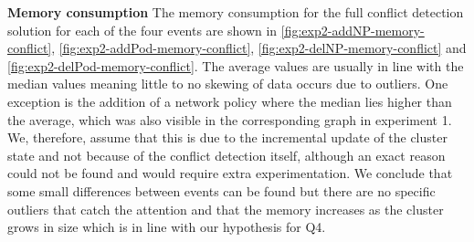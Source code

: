\textbf{Memory consumption}
\newline The memory consumption for the full conflict detection solution for each of the four events are shown in \autoref{fig:exp2-addNP-memory-conflict}, \autoref{fig:exp2-addPod-memory-conflict}, \autoref{fig:exp2-delNP-memory-conflict} and \autoref{fig:exp2-delPod-memory-conflict}. The average values are usually in line with the median values meaning little to no skewing of data occurs due to outliers. One exception is the addition of a network policy where the median lies higher than the average, which was also visible in the corresponding graph in experiment 1. We, therefore, assume that this is due to the incremental update of the cluster state and not because of the conflict detection itself, although an exact reason could not be found and would require extra experimentation. We conclude that some small differences between events can be found but there are no specific outliers that catch the attention and that the memory increases as the cluster grows in size which is in line with our hypothesis for Q4.

